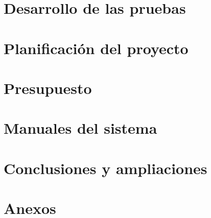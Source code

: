 \documentclass{report}
\begin{document}
\chapter{Desarrollo de las pruebas}
\label{chapter:desarrollo_pruebas}


\chapter{Planificación del proyecto}
\label{chapter:planificacion}


\chapter{Presupuesto}
\label{chapter:presupuesto}

\chapter{Manuales del sistema}
\label{chapter08}


\chapter{Conclusiones y ampliaciones}
\label{chapter:conclusiones_ampliaciones}


\chapter{Anexos}
\label{anexos}


\printbibliography
\end{document}
